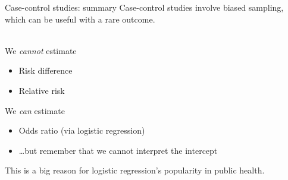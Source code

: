 \documentclass[10pt,t]{beamer}
\newcommand\tab[1][1cm]{\hspace*{#1}}
\begin{document}
\begin{frame}{Case-control studies: summary}
	Case-control studies involve biased sampling, which can be useful with a rare outcome. 
	\\ ~\ 
	
	We \textit{cannot} estimate
	\begin{itemize}
		\item Risk difference 
		\item Relative risk
	\end{itemize}
	\vspace{0.2cm}
	We \textit{can} estimate
	\begin{itemize}
		\item Odds ratio (via logistic regression)
		\item[] \tab \dots but remember that we cannot interpret the intercept
	\end{itemize}
	\vspace{0.2cm}
	This is a big reason for logistic regression's popularity in public health.  
\end{frame}
\end{document}
